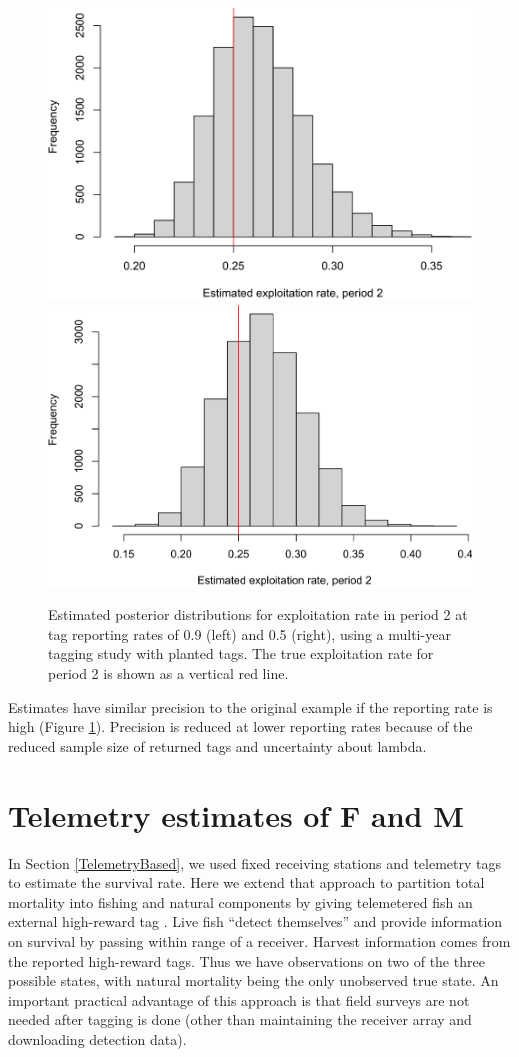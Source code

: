 \documentclass[
]{krantz}
\begin{document}
\begin{figure}
\includegraphics[width=0.5\linewidth]{bookdown_files/figure-latex/BrowniePlot-1} \includegraphics[width=0.5\linewidth]{bookdown_files/figure-latex/BrowniePlot-2} \caption{Estimated posterior distributions for exploitation rate in period 2 at tag reporting rates of 0.9 (left) and 0.5 (right), using a multi-year tagging study with planted tags. The true exploitation rate for period 2 is shown as a vertical red line.}\label{fig:BrowniePlot}
\end{figure}

Estimates have similar precision to the original example if the reporting rate is high (Figure \ref{fig:BrowniePlot}). Precision is reduced at lower reporting rates because of the reduced sample size of returned tags and uncertainty about lambda.

\hypertarget{TelemetryFandM}{%
\section{Telemetry estimates of F and M}\label{TelemetryFandM}}

In Section \ref{TelemetryBased}, we used fixed receiving stations and telemetry tags to estimate the survival rate. Here we extend that approach to partition total mortality into fishing and natural components by giving telemetered fish an external high-reward tag \citep[Design C of][]{hightower.harris2017}. Live fish ``detect themselves'' and provide information on survival by passing within range of a receiver. Harvest information comes from the reported high-reward tags. Thus we have observations on two of the three possible states, with natural mortality being the only unobserved true state. An important practical advantage of this approach is that field surveys are not needed after tagging is done (other than maintaining the receiver array and downloading detection data).
\end{document}
